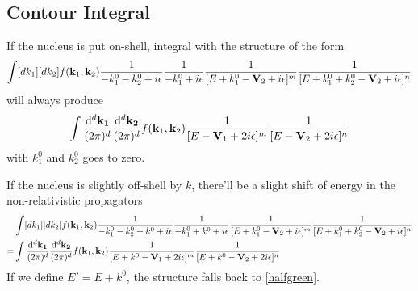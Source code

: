 \documentclass{article}
\renewcommand{\a}{\alpha}
\renewcommand{\b}{\beta}
\begin{document}
\begin{appendices}
	\section{Contour Integral}
	\label{appendix:contour}
	If the nucleus is put on-shell, integral with the structure of the form
	\begin{align}
		\int[dk_1][dk_2]f(\vb{k}_1,\vb{k}_2)\frac{1}{-k_1^0-k_2^0+i\epsilon}\frac{1}{-k_1^0+i\epsilon}\frac{1}{[E+k_1^0-\vb{V}_2+i\epsilon]^m}\frac{1}{[E+k_1^0+k_2^0-\vb{V}_2+i\epsilon]^n}\label{pretemporal}
	\end{align}
	will always produce
	\begin{align}
		\int\frac{\dd^d\vb{k_1}}{(2\pi)^d}\frac{\dd^d\vb{k_2}}{(2\pi)^d}f(\vb{k}_1,\vb{k}_2)\frac{1}{[E-\vb{V}_1+2i\epsilon]^m}\frac{1}{[E-\vb{V}_2+2i\epsilon]^n}\label{halfgreen}
	\end{align}
	with $k_1^0$ and $k_2^0$ goes to zero.

	If the nucleus is slightly off-shell by $k$, there'll be a slight shift of energy in the non-relativistic propagators
	\begin{align*}
		  & \int[dk_1][dk_2]f(\vb{k}_1,\vb{k}_2)\frac{1}{-k_1^0-k_2^0+k^0+i\epsilon}\frac{1}{-k_1^0+k^0+i\epsilon}\frac{1}{[E+k_1^0-\vb{V}_2+i\epsilon]^m}\frac{1}{[E+k_1^0+k_2^0-\vb{V}_2+i\epsilon]^n} \\
		= & \int\frac{\dd^d\vb{k_1}}{(2\pi)^d}\frac{\dd^d\vb{k_2}}{(2\pi)^d}f(\vb{k}_1,\vb{k}_2)\frac{1}{[E+k^0-\vb{V}_1+2i\epsilon]^m}\frac{1}{[E+k^0-\vb{V}_2+2i\epsilon]^n}
	\end{align*}
	If we define $E'=E+k^0$, the structure falls back to \eqref{halfgreen}.


\end{appendices}
\end{document}
